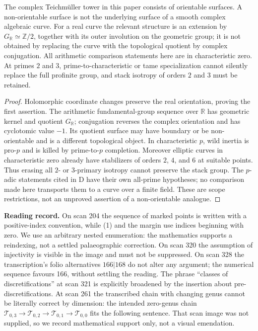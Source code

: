 The complex Teichm\"uller tower in this paper consists of orientable surfaces. A non-orientable surface is not the underlying surface of a smooth complex algebraic curve. For a real curve the relevant structure is an extension by $G_{\mathbb R}\simeq\mathbb Z/2$, together with its outer involution on the geometric group; it is not obtained by replacing the curve with the topological quotient by complex conjugation. All arithmetic comparison statements here are in characteristic zero. At primes $2$ and $3$, prime-to-characteristic or tame specialization cannot silently replace the full profinite group, and stack isotropy of orders $2$ and $3$ must be retained.
\begin{proof}
Holomorphic coordinate changes preserve the real orientation, proving the first assertion. The arithmetic fundamental-group sequence over $\mathbb R$ has geometric kernel and quotient $G_{\mathbb R}$; conjugation reverses the complex orientation and has cyclotomic value $-1$. Its quotient surface may have boundary or be non-orientable and is a different topological object. In characteristic $p$, wild inertia is pro-$p$ and is killed by prime-to-$p$ completion. Moreover elliptic curves in characteristic zero already have stabilizers of orders $2$, $4$, and $6$ at suitable points. Thus erasing all $2$- or $3$-primary isotropy cannot preserve the stack group. The $p$-adic statements cited in D have their own all-prime hypotheses; no comparison made here transports them to a curve over a finite field. These are scope restrictions, not an unproved assertion of a non-orientable analogue.
\end{proof}

\noindent\textbf{Reading record.}
On scan 204 the sequence of marked points is written with a positive-index convention, while (1) and the margin use indices beginning with zero. We use an arbitrary nested enumeration: the mathematics supports a reindexing, not a settled palaeographic correction. On scan 320 the assumption of injectivity is visible in the image and must not be suppressed. On scan 328 the transcription's folio alternatives $166|168$ do not alter any argument; the numerical sequence favours 166, without settling the reading. The phrase ``classes of discretifications'' at scan 321 is explicitly broadened by the insertion about pre-discretifications. At scan 261 the transcribed chain with changing genus cannot be literally correct by dimension: the intended zero-genus chain $\mathcal T_{0,3}\to\mathcal T_{0,2}\to\mathcal T_{0,1}\to\mathcal T_{0,0}$ fits the following sentence. That scan image was not supplied, so we record mathematical support only, not a visual emendation.
